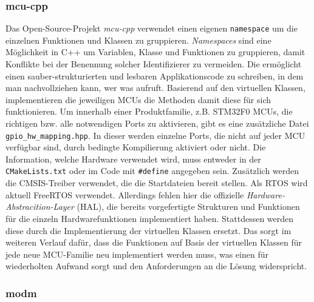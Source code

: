 \subsubsection{mcu-cpp}

Das Open-Source-Projekt \emph{mcu-cpp} verwendet einen eigenen \texttt{namespace} um die einzelnen Funktionen und Klassen zu gruppieren.
\emph{Namespaces} sind eine Möglichkeit in C++ um Variablen, Klasse und Funktionen zu gruppieren, damit Konflikte bei der Benennung solcher Identifizierer zu vermeiden.
Die ermöglicht einen sauber-strukturierten und lesbaren Applikationscode zu schreiben, in dem man nachvollziehen kann, wer was aufruft.
Basierend auf den virtuellen Klassen, implementieren die jeweiligen MCUs die Methoden damit diese für sich funktionieren.
Um innerhalb einer Produktfamilie, z.B. STM32F0 MCUs, die richtigen bzw. alle notwendigen Ports zu aktivieren, gibt es eine zusätzliche Datei \texttt{gpio\_hw\_mapping.hpp}.
In dieser werden einzelne Ports, die nicht auf jeder MCU verfügbar sind, durch bedingte Kompilierung aktiviert oder nicht.
Die Information, welche Hardware verwendet wird, muss entweder in der \texttt{CMakeLists.txt} oder im Code mit \texttt{\#define} angegeben sein.
Zusätzlich werden die CMSIS-Treiber verwendet, die die Startdateien bereit stellen.
Als RTOS wird aktuell FreeRTOS verwendet.
Allerdings fehlen hier die offizielle \emph{Hardware-Abstracition-Layer} (HAL), die bereits vorgefertigte Strukturen und Funktionen für die einzeln Hardwarefunktionen implementiert haben.
Stattdessen werden diese durch die Implementierung der virtuellen Klassen ersetzt.
Das sorgt im weiteren Verlauf dafür, dass die Funktionen auf Basis der virtuellen Klassen für jede neue MCU-Familie neu implementiert werden muss, was einen für wiederholten Aufwand sorgt und den Anforderungen an die Lösung widerspricht.



\subsubsection{modm}




